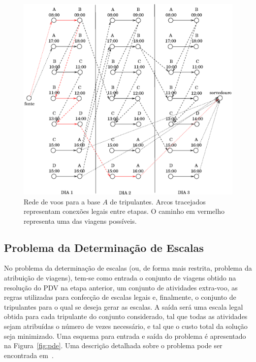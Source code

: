 \documentclass[12pt,a4paper]{article}
\begin{document}
\begin{figure}[htbp]
	\begin{center}
		\includegraphics[scale=0.65]{fig/rede.eps}
		\caption{Rede de voos para a base $A$ de tripulantes. Arcos tracejados representam conexões 
		legais entre etapas. O caminho em vermelho representa uma das viagens possíveis.}
		\label{fig:rede}
	\end{center}
\end{figure}


\subsection{Problema da Determinação de Escalas}
\label{sec:escalas}

No problema da determinação de escalas (ou, de forma mais restrita, problema da atribuição de
viagens), tem-se como entrada o conjunto de viagens obtido na resolução do PDV na etapa anterior, um
conjunto de atividades extra-voo, as regras utilizadas para confecção de escalas legais e,
finalmente, o conjunto de tripulantes para o qual se deseja gerar as escalas. A saída será uma
escala legal obtida para cada tripulante do conjunto considerado, tal que todas as atividades sejam
atribuídas o número de vezes necessário, e tal que o custo total da solução seja minimizado. Uma
esquema para entrada e saída do problema é apresentado na Figura~\ref{fig:pde}. Uma descrição 
detalhada sobre o problema pode ser encontrada em~\cite{kohl04}.
\end{document}
